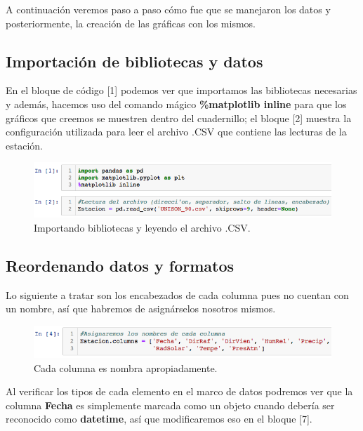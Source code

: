\documentclass[12pt]{article}
\begin{document}
\noindent A continuación veremos paso a paso cómo fue que se manejaron los datos y posteriormente, la creación de las gráficas con los mismos.

\subsection{Importación de bibliotecas y datos}

\noindent En el bloque de código [1] podemos ver que importamos las bibliotecas necesarias y además, hacemos uso del comando mágico \textbf{\%matplotlib inline} para que los gráficos que creemos se muestren dentro del cuadernillo; el bloque [2] muestra la configuración utilizada para leer el archivo .CSV 	que contiene las lecturas de la estación.

\begin{figure}[h!]
	\center
	\includegraphics[scale=.6]{./Images/importacion}
	\caption{\label{fig:importacion} Importando bibliotecas y leyendo el archivo .CSV.}
\end{figure}

\pagebreak

\subsection{Reordenando datos y formatos}

\noindent Lo siguiente a tratar son los encabezados de cada columna pues no cuentan con un nombre, así que habremos de asignárselos nosotros mismos.

\begin{figure}[h!]
	\center
	\includegraphics[scale=.6]{./Images/columnas}
	\caption{\label{fig:columnas} Cada columna es nombra apropiadamente.}
\end{figure}

\noindent Al verificar los tipos de cada elemento en el marco de datos podremos ver que la columna \textbf{Fecha} es simplemente marcada como un objeto cuando debería ser reconocido como \textbf{datetime}, así que modificaremos eso en el bloque [7].
\end{document}
